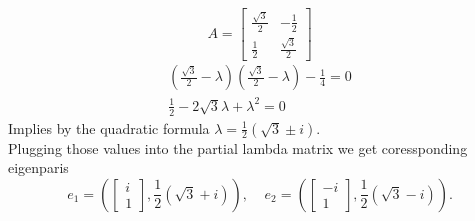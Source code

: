 \documentclass[letter]{article}
\newenvironment{menumerate}{\edef\backupindent{\the\parindent}
  \enumerate\setlength{\parindent}{\backupindent}}
  {\endenumerate}
\begin{document}
\begin{menumerate}
\begin{menumerate}
        \item
        \begin{equation*}
        A =
            \begin{bmatrix}
                \frac{\sqrt{3}}{2}&-\frac{1}{2}\\
                \frac{1}{2}&\frac{\sqrt{3}}{2}
            \end{bmatrix}
        \end{equation*}
        \begin{equation*}
                 \begin{aligned}
                     \left(\frac{\sqrt{3}}{2} - \lambda\right)\left(\frac{\sqrt{3}}{2} - \lambda\right) -\frac{1}{4} = 0 \\
                     \frac{1}{2} - 2\sqrt{3}\lambda + \lambda^2 = 0
                 \end{aligned}
             \end{equation*}
             Implies by the quadratic formula
             $\lambda = \frac{1}{2}(\sqrt{3} \pm i)$.
             \\Plugging those values into the partial lambda matrix we get
             coressponding eigenparis
             \begin{equation*}
                 e_1 = \left(\begin{bmatrix}
                     i \\ 1
                 \end{bmatrix}, \frac{1}{2}(\sqrt{3} + i)\right),
                 \;\;\;\;
                 e_2 = \left(\begin{bmatrix}
                     -i \\ 1
                 \end{bmatrix}
                 , \frac{1}{2}(\sqrt{3} - i)\right).
             \end{equation*}
    \end{menumerate}


\end{menumerate}
\end{document}
